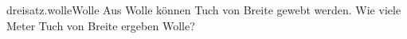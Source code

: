 \begin{exercise}{dreisatz.wolle}{Wolle}
  \ifproblem\problem
    Aus  Wolle können  Tuch von  Breite gewebt
    werden. Wie viele Meter Tuch von  Breite ergeben  Wolle?
  \fi
\end{exercise}
